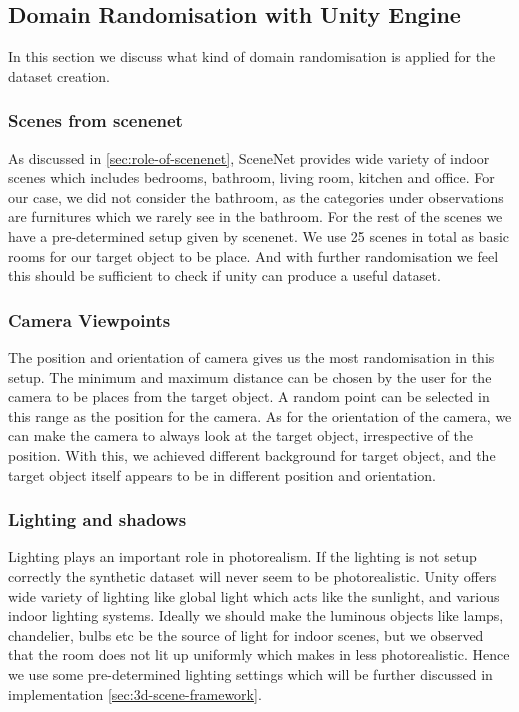 \subsection{Domain Randomisation with Unity Engine}\label{subsec:domain-randomisation-with-unity-engine}
In this section we discuss what kind of domain randomisation is applied for the dataset creation.
\subsubsection{Scenes from scenenet}\label{subsubsec:scenes-from-scenenet}
As discussed in \autoref{sec:role-of-scenenet}, SceneNet provides wide variety of indoor scenes which includes bedrooms, bathroom, living room, kitchen and office.
For our case, we did not consider the bathroom, as the categories under observations are furnitures which we rarely see in the bathroom.
For the rest of the scenes we have a pre-determined setup given by scenenet.
We use 25 scenes in total as basic rooms for our target object to be place.
And with further randomisation we feel this should be sufficient to check if unity can produce a useful dataset.

\subsubsection{Camera Viewpoints}
The position and orientation of camera gives us the most randomisation in this setup.
The minimum and maximum distance can be chosen by the user for the camera to be places from the target object.
A random point can be selected in this range as the position for the camera.
As for the orientation of the camera, we can make the camera to always look at the target object, irrespective of the position.
With this, we achieved different background for target object, and the target object itself appears to be in different position and orientation.

\subsubsection{Lighting and shadows}
Lighting plays an important role in photorealism.
If the lighting is not setup correctly the synthetic dataset will never seem to be photorealistic.
Unity offers wide variety of lighting like global light which acts like the sunlight, and various indoor lighting systems.
Ideally we should make the luminous objects like lamps, chandelier, bulbs etc be the source of light for indoor scenes, but we observed that the room does not lit up uniformly which makes in less photorealistic.
Hence we use some pre-determined lighting settings which will be further discussed in implementation \autoref{sec:3d-scene-framework}.

